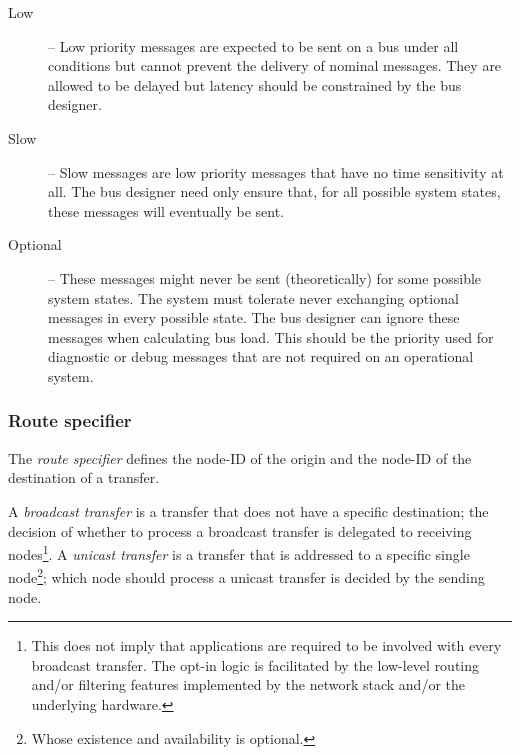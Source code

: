 \begin{remark}[breakable]
\begin{description}
        \item[Low] -- Low priority messages are expected to be sent on a bus under all conditions but cannot
        prevent the delivery of nominal messages.
        They are allowed to be delayed but latency should be constrained by the bus designer.

        \item[Slow] -- Slow messages are low priority messages that have no time sensitivity at all.
        The bus designer need only ensure that, for all possible system states,
        these messages will eventually be sent.

        \item[Optional] -- These messages might never be sent (theoretically) for some possible system states.
        The system must tolerate never exchanging optional messages in every possible state.
        The bus designer can ignore these messages when calculating bus load.
        This should be the priority used for diagnostic or debug messages that are not required on an
        operational system.
    \end{description}
\end{remark}

\subsubsection{Route specifier}\label{sec:transport_route_specifier}

The \emph{route specifier} defines the node-ID of the origin and the node-ID of the destination of a transfer.

A \emph{broadcast transfer} is a transfer that does not have a specific destination;
the decision of whether to process a broadcast transfer is delegated to receiving nodes\footnote{%
    This does not imply that applications are required to be involved with every broadcast transfer.
    The opt-in logic is facilitated by the low-level routing and/or filtering features implemented
    by the network stack and/or the underlying hardware.
}.
A \emph{unicast transfer} is a transfer that is addressed to a specific single node\footnote{%
    Whose existence and availability is optional.
}; which node should process a unicast transfer is decided by the sending node.


